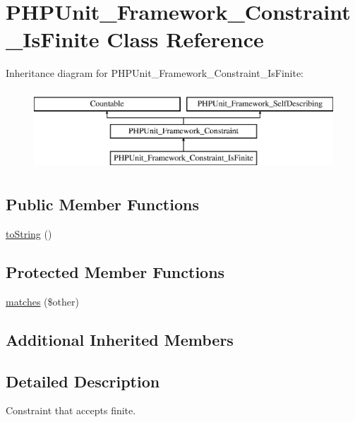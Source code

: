 \hypertarget{class_p_h_p_unit___framework___constraint___is_finite}{}\section{P\+H\+P\+Unit\+\_\+\+Framework\+\_\+\+Constraint\+\_\+\+Is\+Finite Class Reference}
\label{class_p_h_p_unit___framework___constraint___is_finite}
Inheritance diagram for P\+H\+P\+Unit\+\_\+\+Framework\+\_\+\+Constraint\+\_\+\+Is\+Finite\+:\begin{figure}[H]
\begin{center}
\leavevmode
\includegraphics[height=3.000000cm]{class_p_h_p_unit___framework___constraint___is_finite}
\end{center}
\end{figure}
\subsection*{Public Member Functions}
\begin{DoxyCompactItemize}
\item 
\mbox{\hyperlink{class_p_h_p_unit___framework___constraint___is_finite_a5558c5d549f41597377fa1ea8a1cefa3}{to\+String}} ()
\end{DoxyCompactItemize}
\subsection*{Protected Member Functions}
\begin{DoxyCompactItemize}
\item 
\mbox{\hyperlink{class_p_h_p_unit___framework___constraint___is_finite_a9c9c337de483bbdbb9fa249a6c7c9cc5}{matches}} (\$other)
\end{DoxyCompactItemize}
\subsection*{Additional Inherited Members}


\subsection{Detailed Description}
Constraint that accepts finite. 

